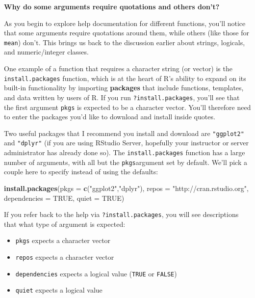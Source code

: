 \documentclass[]{tufte-book}
\newenvironment{Shaded}{\begin{snugshade}}{\end{snugshade}}
\newcommand{\DataTypeTok}[1]{\textcolor[rgb]{0.13,0.29,0.53}{#1}}
\newcommand{\KeywordTok}[1]{\textcolor[rgb]{0.13,0.29,0.53}{\textbf{#1}}}
\newcommand{\NormalTok}[1]{#1}
\newcommand{\OtherTok}[1]{\textcolor[rgb]{0.56,0.35,0.01}{#1}}
\newcommand{\StringTok}[1]{\textcolor[rgb]{0.31,0.60,0.02}{#1}}
\providecommand{\tightlist}{%
  \setlength{\itemsep}{0pt}\setlength{\parskip}{0pt}}
\begin{document}
\vspace*{0.2in}

\noindent\textbf{Why do some arguments require quotations and others don't?}\vspace*{0.1in}

As you begin to explore help documentation for different functions, you'll notice that some arguments require quotations around them, while others (like those for \texttt{mean}) don't. This brings us back to the discussion earlier about strings, logicals, and numeric/integer classes.

One example of a function that requires a character string (or vector) is the \texttt{install.packages} function, which is at the heart of R's ability to expand on its built-in functionality by importing \textbf{packages} that include functions, templates, and data written by users of R. If you run \texttt{?install.packages}, you'll see that the first argument \texttt{pkgs} is expected to be a character vector. You'll therefore need to enter the packages you'd like to download and install inside quotes.

Two useful packages that I recommend you install and download are \texttt{"ggplot2"} and \texttt{"dplyr"} (if you are using RStudio Server, hopefully your instructor or server administrator has already done so). The \texttt{install.packages} function has a large number of arguments, with all but the \texttt{pkgs}argument set by default. We'll pick a couple here to specify instead of using the defaults:

\begin{Shaded}
\begin{Highlighting}[]
\KeywordTok{install.packages}\NormalTok{(}\DataTypeTok{pkgs =} \KeywordTok{c}\NormalTok{(}\StringTok{"ggplot2"}\NormalTok{,}\StringTok{"dplyr"}\NormalTok{),}
         \DataTypeTok{repos =} \StringTok{"http://cran.rstudio.org"}\NormalTok{,}
         \DataTypeTok{dependencies =} \OtherTok{TRUE}\NormalTok{,}
         \DataTypeTok{quiet =} \OtherTok{TRUE}\NormalTok{)}
\end{Highlighting}
\end{Shaded}

If you refer back to the help via \texttt{?install.packages}, you will see descriptions that what type of argument is expected:

\begin{itemize}
\tightlist
\item
  \texttt{pkgs} expects a character vector
\item
  \texttt{repos} expects a character vector
\item
  \texttt{dependencies} expects a logical value (\texttt{TRUE} or \texttt{FALSE})
\item
  \texttt{quiet} expects a logical value
\end{itemize}
\end{document}
